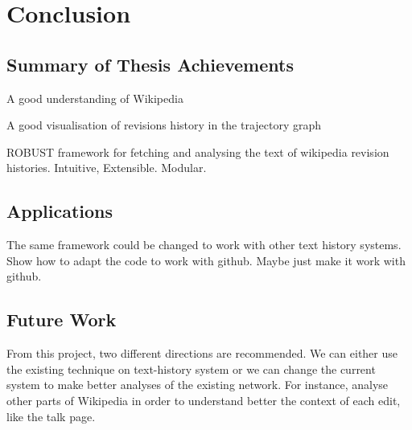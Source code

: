 \chapter{Conclusion}

\label{ch:conclusions}

\section{Summary of Thesis Achievements}

A good understanding of Wikipedia

A good visualisation of revisions history in the trajectory graph

ROBUST framework for fetching and analysing the text of wikipedia
revision histories. Intuitive, Extensible. Modular. 

\section{Applications}

The same framework could be changed to work with other text history
systems. Show how to adapt the code to work with github. Maybe just
make it work with github.

\section{Future Work}

From this project, two different directions are recommended. We can
either use the existing technique on text-history system or we can
change the current system to make better analyses of the existing
network. For instance, analyse other parts of Wikipedia in order to
understand better the context of each edit, like the talk page. 
